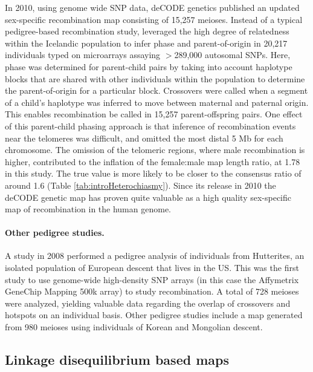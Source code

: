 In 2010, using genome wide SNP data, deCODE genetics published an updated sex-specific recombination map consisting of 15,257 meioses\cite{Kong2010}.
Instead of a typical pedigree-based recombination study, \citet{Kong2010} leveraged the high degree of relatedness within the Icelandic population to infer phase and parent-of-origin in 20,217 individuals typed on microarrays assaying $>$289,000 autosomal SNPs.
Here, phase was determined for parent-child pairs by taking into account haplotype blocks that are shared with other individuals within the population to determine the parent-of-origin for a particular block.
Crossovers were called when a segment of a child's haplotype was inferred to move between maternal and paternal origin.
This enables recombination be called in 15,257 parent-offspring pairs.
One effect of this parent-child phasing approach is that inference of recombination events near the telomeres was difficult, and \citet{Kong2010} omitted the most distal 5 Mb for each chromosome.
The omission of the telomeric regions, where male recombination is higher, contributed to the inflation of the female:male map length ratio, at 1.78 in this study.
The true value is more likely to be closer to the consensus ratio of around 1.6 (Table \ref{tab:introHeterochiasmy}).
Since its release in 2010 the deCODE genetic map has proven quite valuable as a high quality sex-specific map of recombination in the human genome.


\paragraph{Other pedigree studies.}
A study in 2008 performed a pedigree analysis of individuals from Hutterites, an isolated population of European descent that lives in the US\cite{Coop2008}.
This was the first study to use genome-wide high-density SNP arrays (in this case the Affymetrix GeneChip Mapping 500k array) to study recombination.
A total of 728 meioses were analyzed, yielding valuable data regarding the overlap of crossovers and hotspots on an individual basis.
Other pedigree studies include a map generated from 980 meioses using individuals of Korean and Mongolian descent\cite{Bleazard2013}.

\subsection{Linkage disequilibrium based maps}

